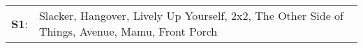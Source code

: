 \begin{supertabular}{p{0.03\textwidth}p{0.92\textwidth}}
 \textbf{S1}:  &  Slacker\textsuperscript{}, \enspace Hangover\textsuperscript{}, \enspace Lively Up Yourself\textsuperscript{}, \enspace 2x2\textsuperscript{}, \enspace The Other Side of Things\textsuperscript{}, \enspace Avenue\textsuperscript{}, \enspace Mamu\textsuperscript{}, \enspace Front Porch\textsuperscript{}  \enspace  \\
\end{supertabular}
